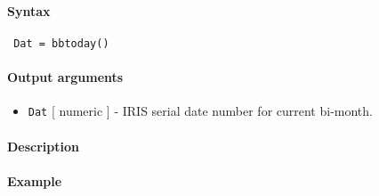 


	\paragraph{Syntax}
 
 \begin{verbatim}
 Dat = bbtoday()
 \end{verbatim}
 
 \paragraph{Output arguments}
 
 \begin{itemize}
 \item
   \texttt{Dat} {[} numeric {]} - IRIS serial date number for current
   bi-month.
 \end{itemize}
 
 \paragraph{Description}
 
 \paragraph{Example}



